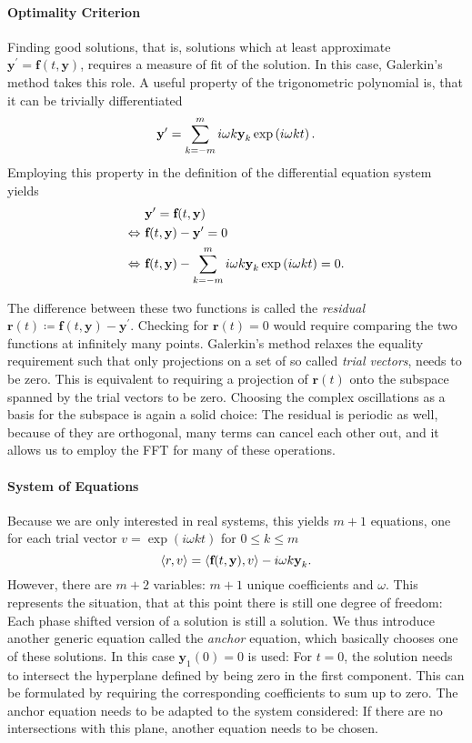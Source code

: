 \documentclass[a4paper,oneside,10pt]{article}
\begin{document}
\paragraph{Optimality Criterion} Finding good solutions, that is, solutions which at least approximate $\textbf{y}^\prime = \textbf{f}(t, \textbf{y})$, requires a measure of fit of the solution.
In this case, Galerkin's method takes this role.
A useful property of the trigonometric polynomial is, that it can be trivially differentiated
\[
	\textbf{y}^\prime = \sum_{k = -m}^m i \omega k \textbf{y}_k \exp\left(i \omega k t\right) \text.
\]
Employing this property in the definition of the differential equation system yields
\begin{align*}
		& \textbf{y}^\prime = \textbf{f}(t,\textbf{y})\\
	\Leftrightarrow\ & \textbf{f}(t,\textbf{y}) - \textbf{y}^\prime = 0\\
	\Leftrightarrow\ & \textbf{f}(t,\textbf{y}) - \sum_{k = -m}^m i \omega k \textbf{y}_k \exp\left(i \omega k t\right) = 0 \text.
\end{align*}

The difference between these two functions is called the \emph{residual} $\textbf{r}(t) \coloneqq \textbf{f}(t,\textbf{y}) - \textbf{y}^\prime$.
Checking for $\textbf{r}(t) = 0$ would require comparing the two functions at infinitely many points.
Galerkin's method relaxes the equality requirement such that only projections on a set of so called \emph{trial vectors}, needs to be zero.
This is equivalent to requiring a projection of $\textbf{r}(t)$ onto the subspace spanned by the trial vectors to be zero.
Choosing the complex oscillations as a basis for the subspace is again a solid choice: The residual is periodic as well, because of they are orthogonal, many terms can cancel each other out, and it allows us to employ the FFT for many of these operations.

\paragraph{System of Equations} Because we are only interested in real systems, this yields $m+1$ equations, one for each trial vector $v = \exp\left( i \omega k t \right)$ for $0 \le k \le m$
\[
	\langle r , v \rangle = \langle \textbf{f}(t,\textbf{y}), v \rangle - i \omega k \textbf{y}_k \text.
\]
However, there are $m+2$ variables: $m+1$ unique coefficients and $\omega$.
This represents the situation, that at this point there is still one degree of freedom: Each phase shifted version of a solution is still a solution.
We thus introduce another generic equation called the \emph{anchor} equation, which basically chooses one of these solutions.
In this case $\textbf{y}_1(0) = 0$ is used:
For $t = 0$, the solution needs to intersect the hyperplane defined by being zero in the first component.
This can be formulated by requiring the corresponding coefficients to sum up to zero.
The anchor equation needs to be adapted to the system considered: If there are no intersections with this plane, another equation needs to be chosen.
\end{document}
